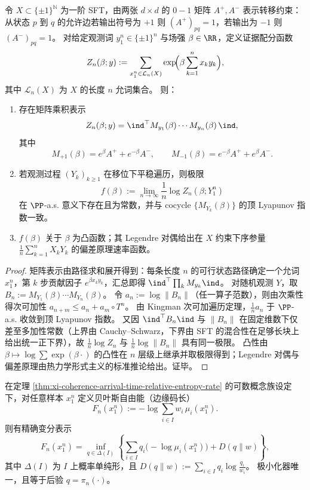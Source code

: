 \begin{theorem}\label{thm:xi-leyang-evidence-ising-lyapunov}
令 \(X\subset\{\pm1\}^{\mathbb N}\) 为一阶 SFT，由两张 \(d\times d\) 的 \(0\!-\!1\) 矩阵 \(A^{+},A^{-}\) 表示转移约束：从状态 \(p\) 到 \(q\) 的允许边若输出符号为 \(+1\) 则 \((A^{+})_{pq}=1\)，若输出为 \(-1\) 则 \((A^{-})_{pq}=1\)。
对给定观测词 \(y_1^n\in\{\pm1\}^n\) 与场强 \(\beta\in\RR\)，定义证据配分函数
\[
Z_n(\beta;y):=\sum_{x_1^n\in\mathcal L_n(X)}\exp\!\Bigl(\beta\sum_{k=1}^n x_k y_k\Bigr),
\]
其中 \(\mathcal L_n(X)\) 为 \(X\) 的长度 \(n\) 允词集合。
则：
\begin{enumerate}
  \item 存在矩阵乘积表示
  \[
  Z_n(\beta;y)=\ind^\top M_{y_1}(\beta)\cdots M_{y_n}(\beta)\,\ind,
  \]
  其中
  \[
  M_{+1}(\beta)=e^{\beta}A^{+}+e^{-\beta}A^{-},
  \qquad
  M_{-1}(\beta)=e^{-\beta}A^{+}+e^{\beta}A^{-}.
  \]
  \item 若观测过程 \((Y_k)_{k\ge 1}\) 在移位下平稳遍历，则极限
  \[
  f(\beta):=\lim_{n\to\infty}\frac1n\log Z_n(\beta;Y_1^n)
  \]
  在 \(\PP\)-a.s. 意义下存在且为常数，并与 cocycle \(\{M_{Y_k}(\beta)\}\) 的顶 Lyapunov 指数一致。
  \item \(f(\beta)\) 关于 \(\beta\) 为凸函数；其 Legendre 对偶给出在 \(X\) 约束下序参量 \(\frac1n\sum_{k=1}^n X_kY_k\) 的偏差原理速率函数。
\end{enumerate}
\end{theorem}

\begin{proof}
矩阵表示由路径求和展开得到：每条长度 \(n\) 的可行状态路径确定一个允词 \(x_1^n\)，第 \(k\) 步贡献因子 \(e^{\beta x_k y_k}\)，汇总即得 \(\ind^\top\prod_k M_{y_k}\ind\)。
对随机观测 \(Y\)，取 \(B_n:=M_{Y_1}(\beta)\cdots M_{Y_n}(\beta)\)。
令 \(a_n:=\log\|B_n\|\)（任一算子范数），则由次乘性得次可加性 \(a_{n+m}\le a_n+a_m\circ T^n\)。
由 Kingman 次可加遍历定理，\(\frac1n a_n\) 于 \(\PP\)-a.s. 收敛到顶 Lyapunov 指数。
又因 \(\ind^\top B_n\ind\) 与 \(\|B_n\|\) 在固定维数下仅差至多加性常数（上界由 Cauchy--Schwarz，下界由 SFT 的混合性在足够长块上给出统一正下界），故 \(\frac1n\log Z_n\) 与 \(\frac1n\log\|B_n\|\) 具有同一极限。
凸性由 \(\beta\mapsto \log\sum\exp(\beta\cdot)\) 的凸性在 \(n\) 层级上继承并取极限得到；Legendre 对偶与偏差原理由热力学形式主义的标准推论给出。证毕。
\end{proof}

\begin{theorem}\label{thm:xi-bayesian-free-energy-variational-posterior-minimizer}
在定理 \ref{thm:xi-coherence-arrival-time-relative-entropy-rate} 的可数概念族设定下，对任意样本 \(x_1^n\) 定义贝叶斯自由能（边缘码长）
\[
F_n(x_1^n):=-\log\sum_{i\in I}w_i\,\mu_i(x_1^n).
\]
则有精确变分表示
\[
F_n(x_1^n)
=
\inf_{q\in\Delta(I)}
\left\{
\sum_{i\in I}q_i\bigl(-\log\mu_i(x_1^n)\bigr)
+
D(q\|w)
\right\},
\]
其中 \(\Delta(I)\) 为 \(I\) 上概率单纯形，且
\(
D(q\|w):=\sum_{i\in I}q_i\log\frac{q_i}{w_i}
\)。
极小化器唯一，且等于后验 \(q=\pi_n(\cdot)\)。
\end{theorem}

